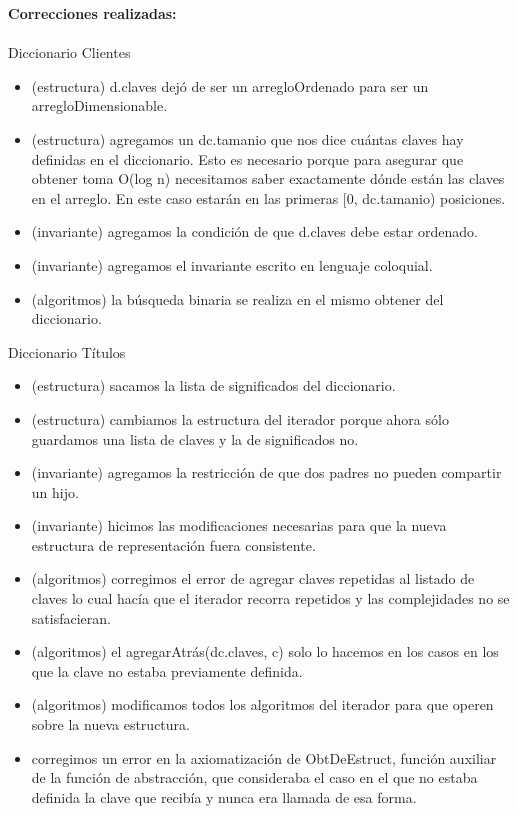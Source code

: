 \textbf{Correcciones realizadas:}\\
\\
Diccionario Clientes
\begin{itemize}
	\item (estructura) d.claves dejó de ser un arregloOrdenado para ser un arregloDimensionable.
	\item (estructura) agregamos un dc.tamanio que nos dice cuántas claves hay definidas en el diccionario. Esto es necesario porque para asegurar que obtener toma O(log n) necesitamos saber exactamente dónde están las claves en el arreglo. En este caso estarán en las primeras [0, dc.tamanio) posiciones.
	\item (invariante) agregamos la condición de que d.claves debe estar ordenado.
	\item (invariante) agregamos el invariante escrito en lenguaje coloquial.
	\item (algoritmos) la búsqueda binaria se realiza en el mismo obtener del diccionario.
\end{itemize}
Diccionario Títulos
\begin{itemize}
	\item (estructura) sacamos la lista de significados del diccionario.
	\item (estructura) cambiamos la estructura del iterador porque ahora sólo guardamos una lista de claves y la de significados no.
	\item (invariante) agregamos la restricción de que dos padres no pueden compartir un hijo.
	\item (invariante) hicimos las modificaciones necesarias para que la nueva estructura de representación fuera consistente.
	\item (algoritmos) corregimos el error de agregar claves repetidas al listado de claves lo cual hacía que el iterador recorra repetidos y las complejidades no se satisfacieran.
	\item (algoritmos) el agregarAtrás(dc.claves, c) solo lo hacemos en los casos en los que la clave no estaba previamente definida.
	\item (algoritmos) modificamos todos los algoritmos del iterador para que operen sobre la nueva estructura.
	\item corregimos un error en la axiomatización de ObtDeEstruct, función auxiliar de la función de abstracción, que consideraba el caso en el que no estaba definida la clave que recibía y nunca era llamada de esa forma.
\end{itemize}
